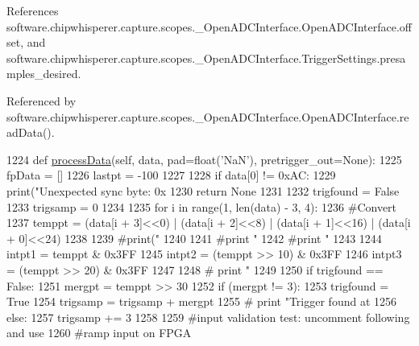 References software.\+chipwhisperer.\+capture.\+scopes.\+\_\+\+Open\+A\+D\+C\+Interface.\+Open\+A\+D\+C\+Interface.\+offset, and software.\+chipwhisperer.\+capture.\+scopes.\+\_\+\+Open\+A\+D\+C\+Interface.\+Trigger\+Settings.\+presamples\+\_\+desired.



Referenced by software.\+chipwhisperer.\+capture.\+scopes.\+\_\+\+Open\+A\+D\+C\+Interface.\+Open\+A\+D\+C\+Interface.\+read\+Data().


\begin{DoxyCode}
1224     \textcolor{keyword}{def }\hyperlink{classsoftware_1_1chipwhisperer_1_1capture_1_1scopes_1_1__OpenADCInterface_1_1OpenADCInterface_a8f8a4b2746fa9f2cea01b2548d09abc9}{processData}(self, data, pad=float(\textcolor{stringliteral}{'NaN'}), pretrigger\_out=\textcolor{keywordtype}{None}):
1225         fpData = []
1226         lastpt = -100
1227 
1228         \textcolor{keywordflow}{if} data[0] != 0xAC:
1229             print(\textcolor{stringliteral}{"Unexpected sync byte: 0x%
1230             \textcolor{keywordflow}{return} \textcolor{keywordtype}{None}
1231 
1232         trigfound = \textcolor{keyword}{False}
1233         trigsamp = 0
1234 
1235         \textcolor{keywordflow}{for} i \textcolor{keywordflow}{in} range(1, len(data) - 3, 4):
1236             \textcolor{comment}{#Convert}
1237             temppt = (data[i + 3]<<0) | (data[i + 2]<<8) | (data[i + 1]<<16) | (data[i + 0]<<24)
1238 
1239             \textcolor{comment}{#print("%
1240 
1241             \textcolor{comment}{#print "%
1242             \textcolor{comment}{#print "%
1243 
1244             intpt1 = temppt & 0x3FF
1245             intpt2 = (temppt >> 10) & 0x3FF
1246             intpt3 = (temppt >> 20) & 0x3FF
1247 
1248             \textcolor{comment}{# print "%
1249 
1250             \textcolor{keywordflow}{if} trigfound == \textcolor{keyword}{False}:
1251                 mergpt = temppt >> 30
1252                 \textcolor{keywordflow}{if} (mergpt != 3):
1253                        trigfound = \textcolor{keyword}{True}
1254                        trigsamp = trigsamp + mergpt
1255                        \textcolor{comment}{# print "Trigger found at %
1256                 \textcolor{keywordflow}{else}:
1257                    trigsamp += 3
1258 
1259             \textcolor{comment}{#input validation test: uncomment following and use}
1260             \textcolor{comment}{#ramp input on FPGA}
}}}}}}
\end{DoxyCode}
